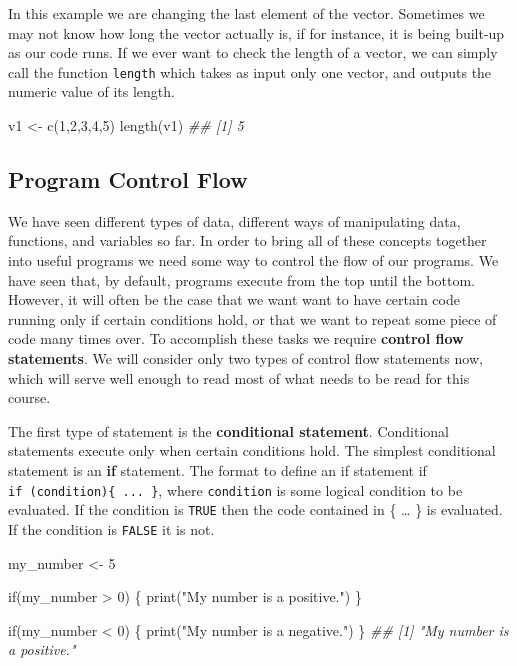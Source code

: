 \documentclass[
  letterpaper,
  DIV=11,
  numbers=noendperiod]{scrreprt}
\newenvironment{Shaded}{\begin{snugshade}}{\end{snugshade}}
\newcommand{\ControlFlowTok}[1]{\textcolor[rgb]{0.00,0.23,0.31}{#1}}
\newcommand{\DecValTok}[1]{\textcolor[rgb]{0.68,0.00,0.00}{#1}}
\newcommand{\DocumentationTok}[1]{\textcolor[rgb]{0.37,0.37,0.37}{\textit{#1}}}
\newcommand{\FunctionTok}[1]{\textcolor[rgb]{0.28,0.35,0.67}{#1}}
\newcommand{\NormalTok}[1]{\textcolor[rgb]{0.00,0.23,0.31}{#1}}
\newcommand{\OtherTok}[1]{\textcolor[rgb]{0.00,0.23,0.31}{#1}}
\newcommand{\SpecialCharTok}[1]{\textcolor[rgb]{0.37,0.37,0.37}{#1}}
\newcommand{\StringTok}[1]{\textcolor[rgb]{0.13,0.47,0.30}{#1}}
\theoremstyle{definition}
\theoremstyle{definition}
\theoremstyle{definition}
\theoremstyle{remark}
\begin{document}
In this example we are changing the last element of the vector.
Sometimes we may not know how long the vector actually is, if for
instance, it is being built-up as our code runs. If we ever want to
check the length of a vector, we can simply call the function
\texttt{length} which takes as input only one vector, and outputs the
numeric value of its length.

\begin{Shaded}
\begin{Highlighting}[]
\NormalTok{v1 }\OtherTok{\textless{}{-}} \FunctionTok{c}\NormalTok{(}\DecValTok{1}\NormalTok{,}\DecValTok{2}\NormalTok{,}\DecValTok{3}\NormalTok{,}\DecValTok{4}\NormalTok{,}\DecValTok{5}\NormalTok{)}
\FunctionTok{length}\NormalTok{(v1)}
\DocumentationTok{\#\# [1] 5}
\end{Highlighting}
\end{Shaded}

\subsection{Program Control Flow}\label{program-control-flow}

We have seen different types of data, different ways of manipulating
data, functions, and variables so far. In order to bring all of these
concepts together into useful programs we need some way to control the
flow of our programs. We have seen that, by default, programs execute
from the top until the bottom. However, it will often be the case that
we want want to have certain code running only if certain conditions
hold, or that we want to repeat some piece of code many times over. To
accomplish these tasks we require \textbf{control flow statements}. We
will consider only two types of control flow statements now, which will
serve well enough to read most of what needs to be read for this course.

The first type of statement is the \textbf{conditional statement}.
Conditional statements execute only when certain conditions hold. The
simplest conditional statement is an \textbf{if} statement. The format
to define an if statement if \texttt{if\ (condition)\{\ ...\ \}}, where
\texttt{condition} is some logical condition to be evaluated. If the
condition is \texttt{TRUE} then the code contained in \{ \ldots{} \} is
evaluated. If the condition is \texttt{FALSE} it is not.

\begin{Shaded}
\begin{Highlighting}[]
\NormalTok{my\_number }\OtherTok{\textless{}{-}} \DecValTok{5}

\ControlFlowTok{if}\NormalTok{(my\_number }\SpecialCharTok{\textgreater{}} \DecValTok{0}\NormalTok{) \{}
    \FunctionTok{print}\NormalTok{(}\StringTok{"My number is a positive."}\NormalTok{)}
\NormalTok{\}}

\ControlFlowTok{if}\NormalTok{(my\_number }\SpecialCharTok{\textless{}} \DecValTok{0}\NormalTok{) \{}
    \FunctionTok{print}\NormalTok{(}\StringTok{"My number is a negative."}\NormalTok{)}
\NormalTok{\}}
\DocumentationTok{\#\# [1] "My number is a positive."}
\end{Highlighting}
\end{Shaded}
\end{document}
